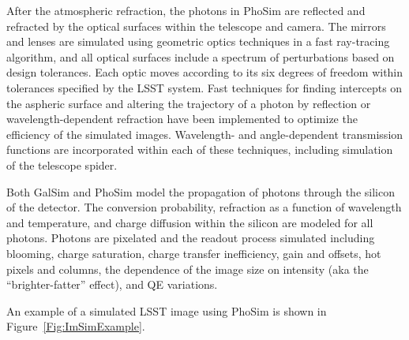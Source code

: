 After the atmospheric refraction, the photons in PhoSim are reflected
and refracted by the optical surfaces within the telescope and
camera. The mirrors and lenses are simulated using geometric optics
techniques in a fast ray-tracing algorithm, and all optical surfaces
include a spectrum of perturbations based on design tolerances. Each
optic moves according to its six degrees of freedom within tolerances
specified by the LSST system. Fast techniques for finding intercepts
on the aspheric surface and altering the trajectory of a photon by
reflection or wavelength-dependent refraction have been implemented to
optimize the efficiency of the simulated images. Wavelength- and
angle-dependent transmission functions are incorporated within each of
these techniques, including simulation of the telescope spider.

Both GalSim and PhoSim model the propagation of photons through the
silicon of the detector. The conversion probability, refraction as a
function of wavelength and temperature, and charge diffusion within
the silicon are modeled for all photons. Photons are pixelated and the
readout process simulated including blooming, charge saturation,
charge transfer inefficiency, gain and offsets, hot pixels and
columns, the dependence of the image size on intensity (aka the
``brighter-fatter'' effect), and QE variations.

An example of a simulated LSST image using PhoSim is shown in
Figure~\ref{Fig:ImSimExample}.
